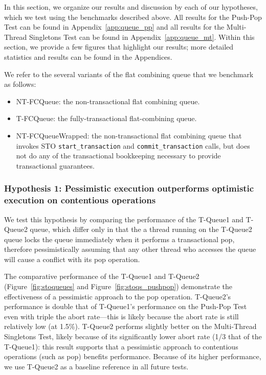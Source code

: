 In this section, we organize our results and discussion by each of our hypotheses, which we test using the benchmarks described above. All results for the Push-Pop Test can be found in Appendix~\ref{app:queue_pp} and all results for the Multi-Thread Singletons Test can be found in Appendix~\ref{app:queue_mt}. Within this section, we provide a few figures that highlight our results; more detailed statistics and results can be found in the Appendices. 

We refer to the several variants of the flat combining queue that we benchmark as follows:
\begin{itemize}
    \item NT-FCQueue: the non-transactional flat combining queue.
    \item T-FCQueue: the fully-transactional flat-combining queue.
    \item NT-FCQueueWrapped: the non-transactional flat combining queue that invokes STO \texttt{start\_transaction} and \texttt{commit\_transaction} calls, but does not do any of the transactional bookkeeping necessary to provide transactional guarantees.
\end{itemize}

\subsubsection{Hypothesis 1: Pessimistic execution outperforms optimistic execution on contentious operations}

We test this hypothesis by comparing the performance of the T-Queue1 and T-Queue2 queue, which differ only in that the a thread running on the T-Queue2 queue locks the queue immediately when it performs a transactional pop, therefore pessimistically assuming that any other thread who accesses the queue will cause a conflict with its pop operation.

The comparative performance of the T-Queue1 and T-Queue2 (Figure~\ref{fig:stoqueues} and Figure~\ref{fig:stoqs_pushpop}) demonstrate the effectiveness of a pessimistic approach to the pop operation. T-Queue2's performance is double that of T-Queue1's performance on the Push-Pop Test even with triple the abort rate---this is likely because the abort rate is still relatively low (at 1.5\%). T-Queue2 performs slightly better on the Multi-Thread Singletons Test, likely because of its significantly lower abort rate (1/3 that of the T-Queue1): this result supports that a pessimistic approach to contentious operations (such as pop) benefits performance. Because of its higher performance, we use T-Queue2 as a baseline reference in all future tests.

